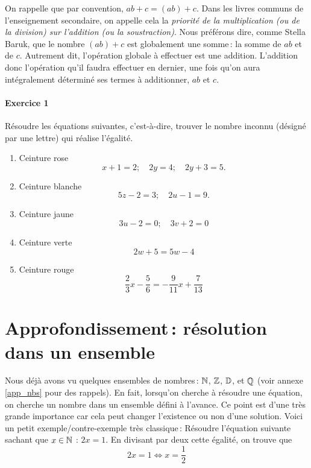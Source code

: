 		On rappelle que par convention, $ab+c=(ab)+c$. Dans les livres communs de l'enseignement secondaire, on appelle cela la \emph{priorité de la multiplication (ou de la division) sur l'addition (ou la soustraction)}. Nous préférons dire, comme Stella Baruk, que le nombre $(ab)+c$ est globalement une somme\,: la somme de $ab$ et de $c$. Autrement dit, l'opération globale à effectuer est une addition. L'addition donc l'opération qu'il faudra effectuer en dernier, une fois qu'on aura intégralement déterminé ses termes à additionner, $ab$ et $c$. 

		\paragraph{Exercice 1} Résoudre les équations suivantes, c'est-à-dire, trouver le nombre inconnu (désigné par une lettre) qui réalise l'égalité.
		\begin{enumerate}
			\item Ceinture rose
			\begin{equation}
			 	x+1=2;\quad 2y=4;\quad 2y+3=5.
			\end{equation} 
			\item Ceinture blanche
			\begin{equation}
				5z-2=3;\quad 2u-1=9.
			\end{equation}
			\item Ceinture jaune
			\begin{equation}
				3u-2=0;\quad 3v+2=0
			\end{equation}
			\item Ceinture verte
			\begin{equation}
				2w+5=5w-4
			\end{equation}
			\item Ceinture rouge
			\begin{equation}
				\frac{2}{3}x-\frac{5}{6}=-\frac{9}{11}x+\frac{7}{13}
			\end{equation}
		\end{enumerate}

	\section{Approfondissement\,: résolution dans un ensemble}

		Nous déjà avons vu quelques ensembles de nombres\,: $\mathbb{N}$, $\mathbb{Z}$, $\mathbb{D}$, et $\mathbb{Q}$ (voir annexe \ref{app_nbs} pour des rappels).
		En fait, lorsqu'on cherche à résoudre une équation, on cherche un nombre dans un ensemble défini à l'avance. Ce point est d'une très grande importance car cela peut changer l'existence ou non d'une solution. Voici un petit exemple/contre-exemple très classique\,:
		Résoudre l'équation suivante sachant que $x\in \mathbb{N}$ : $2x=1$. En divisant par deux cette égalité, on trouve que
		\begin{equation}
			2x=1 \Leftrightarrow x=\frac{1}{2} 
		\end{equation}

